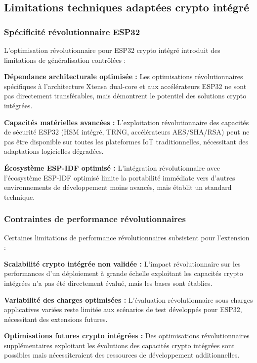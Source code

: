 \subsection{Limitations techniques adaptées crypto intégré}

\subsubsection{Spécificité révolutionnaire ESP32}

L'optimisation révolutionnaire pour ESP32 crypto intégré introduit des limitations de généralisation contrôlées :

\textbf{Dépendance architecturale optimisée :} Les optimisations révolutionnaires spécifiques à l'architecture Xtensa dual-core et aux accélérateurs ESP32 ne sont pas directement transférables, mais démontrent le potentiel des solutions crypto intégrées.

\textbf{Capacités matérielles avancées :} L'exploitation révolutionnaire des capacités de sécurité ESP32 (HSM intégré, TRNG, accélérateurs AES/SHA/RSA) peut ne pas être disponible sur toutes les plateformes IoT traditionnelles, nécessitant des adaptations logicielles dégradées.

\textbf{Écosystème ESP-IDF optimisé :} L'intégration révolutionnaire avec l'écosystème ESP-IDF optimisé limite la portabilité immédiate vers d'autres environnements de développement moins avancés, mais établit un standard technique.

\subsubsection{Contraintes de performance révolutionnaires}

Certaines limitations de performance révolutionnaires subsistent pour l'extension :

\textbf{Scalabilité crypto intégrée non validée :} L'impact révolutionnaire sur les performances d'un déploiement à grande échelle exploitant les capacités crypto intégrées n'a pas été directement évalué, mais les bases sont établies.

\textbf{Variabilité des charges optimisées :} L'évaluation révolutionnaire sous charges applicatives variées reste limitée aux scénarios de test développés pour ESP32, nécessitant des extensions futures.

\textbf{Optimisations futures crypto intégrées :} Des optimisations révolutionnaires supplémentaires exploitant les évolutions des capacités crypto intégrées sont possibles mais nécessiteraient des ressources de développement additionnelles.

